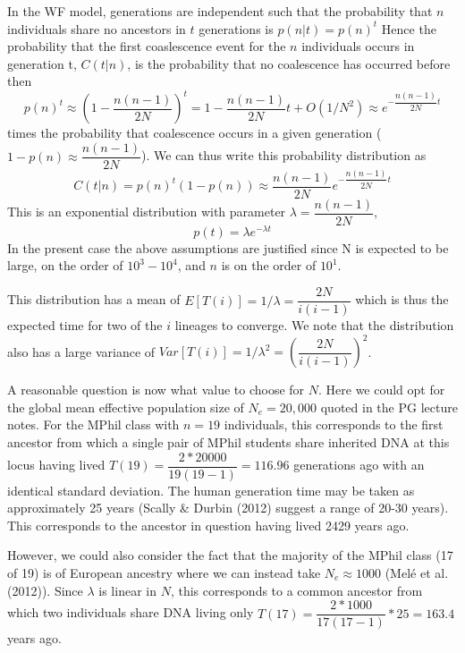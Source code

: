 \documentclass{article}
\begin{document}
In the WF model, generations are independent such that the probability that $n$ individuals share no ancestors in $t$ generations is
$p(n| t) = p(n)^t$
Hence the probability that the first coaslescence event for the $n$ individuals occurs in generation t, $C(t|n)$, is the probability that no coalescence has occurred before then 
\begin{equation}
p(n)^{t} \approx (1 - \dfrac{n(n-1)}{2N})^t = 1 - \dfrac{n(n-1)}{2N} t + O(1/N^2) \approx e^{-\dfrac{n(n-1)}{2N} t}
\end{equation}
 times the probability that coalescence occurs in a given generation ($1-p(n) \approx \dfrac{n(n-1)}{2N}$). We can thus write this probability distribution as 
\begin{equation}\label{eq:coal}
C(t|n) = p(n)^{t} (1-p(n)) \approx  \dfrac{n(n-1)}{2N} e^{-\dfrac{n(n-1)}{2N} t}
\end{equation}
This is an exponential distribution with parameter $\lambda = \dfrac{n(n-1)}{2N}$,
\begin{equation}
p(t) = \lambda e^{-\lambda t}
\end{equation}
In the present case the above assumptions are justified since N is expected to be large, on the order of $10^3 - 10^4$, and $n$ is on the order of $10^1$.

This distribution has a mean of $E[T(i)] = 1 / \lambda =  \dfrac{2N}{i(i-1)}$ which is thus the expected time for two of the $i$ lineages to converge.
We note that the distribution also has a large variance of $Var[T(i)] = 1 / \lambda^2 =  (\dfrac{2N}{i(i-1)})^2$.

A reasonable question is now what value to choose for $N$. Here we could opt for the global mean effective population size of $N_e = 20,000$ quoted in the PG lecture notes. For the MPhil class with $n=19$ individuals, this corresponds to the first ancestor from which a single pair of MPhil students share inherited DNA at this locus having lived $T(19) = \dfrac{2*20000}{19(19-1)}=116.96$ generations ago with an identical standard deviation. The human generation time may be taken as approximately 25 years (Scally \& Durbin (2012) suggest a range of 20-30 years). This corresponds to the ancestor in question having lived 2429 years ago.

However, we could also consider the fact that the majority of the MPhil class (17 of 19) is of European ancestry where we can instead take $N_e \approx 1000$ (Melé et al. (2012)). Since $\lambda$ is linear in $N$, this corresponds to a common ancestor from which two individuals share DNA living only $T(17) = \dfrac{2*1000}{17(17-1)} * 25 = 163.4$ years ago.
\end{document}
